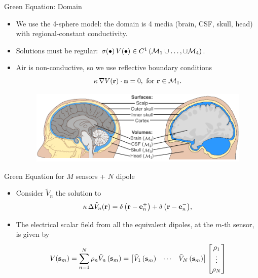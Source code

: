 \documentclass[progressbar=head]{beamer}
\begin{document}
\begin{frame}{Green Equation: Domain}
\begin{itemize}
\item We use the 4-sphere model: the domain is 4 media (brain, CSF, skull, head) with regional-constant conductivity.
\item Solutions must be regular:
$\sigma(\bullet)\, V(\bullet) \in C^1 \left( \mathcal{M}_1 \cup \dots, \cup \mathcal{M}_4 \right)$.
\item Air is non-conductive, so we use reflective boundary conditions
\begin{equation}
\kappa\, \nabla V(\mathbf{r}) \cdot \mathbf{n} = 0, \text{ for } \mathbf{r}\in \mathcal{M}_1.
\end{equation}
\begin{figure}
\centering
\includegraphics[width=0.8\linewidth]{./img/HeadSurfacesVolumes}
\end{figure}
\end{itemize}
\end{frame}

\begin{frame}{Green Equation for $M$ sensors + $N$ dipole}
\begin{itemize}
\item Consider $\tilde{V}_n$ the solution to 
\begin{equation}
\kappa\, \Delta { \tilde{V}_n(\mathbf{r}) } = 
{ \delta\left( \mathbf{r}-\mathbf{e}_n^+ \right) + \delta\left( \mathbf{r}-\mathbf{e}_n^- \right) },
\end{equation}
\item The electrical scalar field from all the equivalent dipoles, at the $m$-th sensor, is given by
\begin{equation}
V(\mathbf{s}_m) = \sum_{n=1}^N \rho_n \tilde{V}_n \left( \mathbf{s}_m \right)
=
\begin{bmatrix}
\tilde{V}_1 \left( \mathbf{s}_m \right) &
\cdots &
\tilde{V}_N \left( \mathbf{s}_m \right)
\end{bmatrix}
\begin{bmatrix}
\rho_1 \\ \vdots \\ \rho_N
\end{bmatrix}
\label{eq:stack}
\end{equation}
\end{itemize}
\end{frame}
\end{document}
